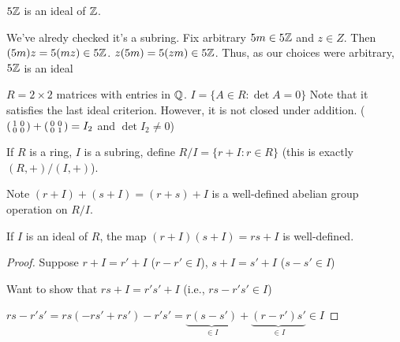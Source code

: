 \documentclass[notes.tex]{subfiles}
\begin{document}
\begin{eg}
	$5\mathbb{Z}$ is an ideal of $\mathbb{Z}$. 

	We've alredy checked it's a subring.
	Fix arbitrary $5m\in 5\mathbb{Z}$ and $z\in Z$.
	Then $(5m)z = 5(mz) \in 5\mathbb{Z}$.
	$z(5m) = 5(zm) \in 5\mathbb{Z}$. Thus, as our choices were arbitrary, $5\mathbb{Z}$ is an ideal
\end{eg}

\begin{eg}
$R = 2\times 2$ matrices with entries in $\mathbb{Q}$.
$I = \{A\in R : \det A = 0\}$
Note that it satisfies the last ideal criterion. However, it is not closed under addition. ($\smattwo 1,0|0,0 + \smattwo 0,0|0,1 = I_2$ and $\det I_2 \ne 0$)
\end{eg}

\begin{defn}
	If $R$ is a ring, $I$ is a subring, define $R/I = \{r+I : r\in R\}$ (this is exactly $(R, +)/(I, +)$).
\end{defn}

Note $(r + I) + (s + I) = (r + s) + I$ is a well-defined abelian group operation on $R/I$.

\begin{proposition}
	If $I$ is an ideal of $R$, the map $(r + I)(s + I) = rs + I$ is well-defined.
\end{proposition}
\begin{proof}
	Suppose $r + I = r' + I$ ($r - r' \in I$), $s + I = s' + I$ ($s - s' \in I$)

	Want to show that $rs + I = r's' + I$ (i.e., $rs-r's' \in I$)

	$rs - r's' = rs(-rs' + rs') - r's' = \underbrace{r(s-s')}_{\in I} + \underbrace{(r-r')s'}_{\in I}\in I$
\end{proof}
\end{document}
